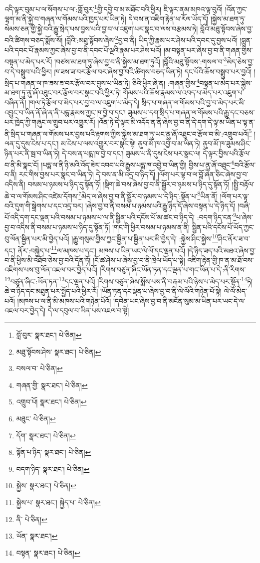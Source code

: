 འདི་ལྟར་བུམ་པ་ལ་སོགས་པ་ལ་:གློ་བུར་\footnote{བློ་བུར་  སྣར་ཐང་།  པེ་ཅིན། }གྱི་དབྱེ་བ་མ་མཐོང་བའི་ཕྱིར། ཇི་ལྟར་ནམ་མཁའ་ལྟ་བུའོ། །འོན་ཀྱང་ལྷག་མ་ནི་སྐྱེ་བ་གཞན་ལ་གོམས་པའི་ཁྱད་པར་ཡིན་ཏེ། དེ་བས་ན་འཇིག་རྟེན་ཕ་རོལ་ཡོད་དོ། །སྐྱེས་མ་ཐག་ཏུ་སེམས་ཅན་གྱི་སྐྱེ་བའི་རྒྱུ་སྲེད་པས་བྱས་པའི་བྱ་བ་ལ་འཇུག་པར་སྣང་བ་ལས་བརྩམས་ཏེ། བློའི་མཐུ་སྟོབས་ཞེས་བྱ་བའི་ཚིགས་བཅད་སྨོས་སོ། །བློའི་:མཐུ་སྟོབས་ཞེས་\footnote{མཐུ་སྟོབས་ཤེས་  སྣར་ཐང་།  པེ་ཅིན། }བྱ་བ་ནི། ཡིད་ཀྱི་རྣམ་པར་ཤེས་པའི་དབང་དུ་བྱས་པའོ། །བླུན་པའི་དབང་པོ་རྣམས་ཀྱང་ཞེས་བྱ་བ་ནི་དབང་པོ་ལྔའི་རྣམ་པར་ཤེས་པའོ། །མ་བསྟན་པར་ཞེས་བྱ་བ་ནི་གཞན་གྱིས་བསྟན་པ་མེད་པར་རོ། །བཙས་མ་ཐག་ཏུ་ཞེས་བྱ་བ་ནི་སྐྱེས་མ་ཐག་ཏུའོ། །བློའི་མཐུ་སྟོབས་:གསལ་བ་\footnote{བསལ་བ་  པེ་ཅིན། }མེད་ཅེས་བྱ་བ་དེ་བསྒྲུབ་པའི་ཕྱིར། ཁ་ཟས་ཟ་བར་རྩོལ་བར་ཞེས་བྱ་བའི་ཚིགས་བཅད་ཡིན་ཏེ། དང་པོའི་ཆོས་བསྒྲུབ་པར་བྱའོ། །སྲིད་པ་གཞན་ལ་ཁ་ཟས་ཟ་བར་རྩོལ་བར་བྱས་པ་ཡིན་ཏེ། ཅིའི་ཕྱིར་ཞེ་ན། :གཞན་གྱིས་\footnote{གཞན་གྱི་  སྣར་ཐང་།  པེ་ཅིན། }བསྟན་པ་མེད་པར་སྐྱེས་མ་ཐག་ཏུ་ནུ་ཞོ་འཐུང་བར་རྩོལ་བར་སྣང་བའི་ཕྱིར་ཏེ། གོམས་པའི་ཆོས་རྣམས་ལ་འབད་པ་མེད་པར་འཇུག་པ་བཞིན་ནོ། །གལ་ཏེ་རྩོལ་བ་མེད་པར་བྱ་བ་ལ་འཇུག་པ་མེད་དེ། སྲིད་པ་གཞན་ལ་གོམས་པའི་བྱ་བ་མེད་པར་མི་འབྱུང་བ་ཡིན་ནོ་ཞེ་ན་ནི་པདྨ་རྣམས་ཀྱང་ཁ་བྱེ་བ་དང་། ཟུམས་པ་དག་སྲིད་པ་གཞན་ལ་གོམས་པའི་རྒྱུ་དང་བཅས་པར་ཁྱེད་ཀྱི་གཞུང་ལ་གྲུབ་པར་འགྱུར་རོ། །འོན་ཏེ་དེ་ལྟར་མི་འདོད་ན་ནི་ཞེས་བྱ་བ་ནི་དེ་དག་དེ་ལྟ་མ་ཡིན་པ་ལྟ་ན་ནི་སྲིད་པ་གཞན་ལ་གོམས་པར་བྱས་པའི་རྟགས་ཀྱིས་སྐྱེས་མ་ཐག་ཏུ་ཡང་ནུ་ཞོ་འཐུང་བ་རྩོལ་བ་མི་:འགྲུབ་པའོ།\footnote{འགྲུབ་པོ།  སྣར་ཐང་།  པེ་ཅིན། } །ལན་དུ་དུས་ངེས་པ་དང་། མ་ངེས་པ་ལས་འགྱུར་བར་སྣང་སྟེ། ནུབ་མོ་ཁ་འབྱེ་བ་མ་ཡིན་ཏེ། ནུབ་མོ་ཁ་ཟུམས་ཤིང་ཉིན་པར་ནི་སྦ་བ་ཡིན་ཏེ། དེ་བས་ན་པདྨ་ཁ་བྱེ་བ་དང་། ཟུམས་པ་ནི་དུས་ངེས་པར་སྣང་ལ། དེ་ལྟར་བྱིས་པའི་རྩོལ་བ་ནི་མི་སྣང་ངོ། །པདྨ་ལ་ནི་ཉི་མའི་འོད་ཟེར་འབབ་པའི་རྒྱུས་པདྨ་ཁ་འབྱེ་བ་ཡིན་གྱི། བྱིས་པ་ནུ་ཞོ་འཐུང་\footnote{མཐུང་  པེ་ཅིན། }བའི་རྩོལ་བ་ནི། རང་གིས་བྱས་པར་སྣང་བ་ཡིན་ཏེ། དེ་བས་ན་མི་འདྲ་བ་ཉིད་དོ། །ལོག་པར་ལྟ་བ་ལ་བློ་ཞེན་ཅིང་ཞེས་བྱ་བ་འདིས་ནི། བསམ་པ་ཉམས་པ་ཉིད་དུ་སྟོན་ཏོ། །སྡིག་ཆེ་བས་ཞེས་བྱ་བ་ནི་སྦྱོར་བ་ཉམས་པ་ཉིད་དུ་སྟོན་ཏོ། །སྤྱི་བརྟོལ་ཆེ་བ་ལ་གོམས་ཤིང་འཛེམ་དོགས་\footnote{དོག་  སྣར་ཐང་།  པེ་ཅིན། }མེད་ལ་ཞེས་བྱ་བ་ནི་སྦྱོར་བ་ཉམས་པ་དེ་ཉིད་:སྟོན་པ་\footnote{སྟོན་པ་ཉིད་  སྣར་ཐང་།  པེ་ཅིན། }ཡིན་ནོ། །ལོག་པར་ལྟ་བའི་དུག་གི་སྒྲེགས་པ་དང་འདྲ་བར། །ཞེས་བྱ་བ་ནི་བསམ་པ་ཉམས་པའི་རྒྱུ་ཉིད་དོ་ཞེས་བསྟན་པ་དེ་ཉིད་དོ། །བཞི་པོ་འདི་དག་དང་ལྡན་པའི་བསམ་པ་ཉམས་པ་ལ་ནི་སྦྱིན་པའི་དངོས་པོ་མ་ཚང་བ་ཉིད་དེ། :བདག་ཉིད་ངན་\footnote{བདག་ཉིད་  སྣར་ཐང་།  པེ་ཅིན། }པ་ཞེས་བྱ་བ་འདིས་ནི་བསམ་པ་ཉམས་པ་ཉིད་དུ་སྟོན་ཏོ། །གང་གི་ཕྱིར་བསམ་པ་ཉམས་ན་ནི། སྦྱིན་པའི་དངོས་པོ་ཡོད་ཀྱང་བུ་ལོན་སྦྱིན་པར་མི་བྱེད་པའོ། །རྒྱུ་གསུམ་གྱིས་ཀྱང་སྦྱིན་པ་སྦྱིན་པར་མི་བྱེད་དེ། :སྐྱེས་ཤིང་སྐྱེས་\footnote{སྐྱེས་  སྣར་ཐང་།  པེ་ཅིན། }ཤིང་ནོར་ཟ་བ་དང་། ནོར་:བསྐྱེད་པ་\footnote{སྐྱེས་པ་  སྣར་ཐང་། སྐྱེད་པ་  པེ་ཅིན། }ལ་མཁས་པ་དང་། མཁས་པ་ཡིན་ཡང་ལེ་ལོ་དང་ལྡན་པའོ། །དེ་ཉིད་ཟད་པའི་མཐའ་ཞེས་བྱ་བ་ནི་ཕྱིས་མི་འཐོབ་ཅེས་བྱ་བའི་དོན་ཏོ། །ངོ་ཚ་ཤེས་པ་ཞེས་བྱ་བ་ནི་ཁྲེལ་ཡོད་པ་སྟེ། འཇིག་རྟེན་གྱི་ཁ་ན་མ་ཐོ་བས་འཇིགས་པས་བུ་ལོན་འཇལ་བར་བྱེད་པའོ། །རིགས་བཙུན་ཞིང་ཡོན་ཏན་དང་ལྡན་པ་གང་ཡིན་པ་དེ་:ནི་རིགས་\footnote{ནི་  པེ་ཅིན། }བཙུན་ཞིང་:ཡོན་ཏན་\footnote{ཡོན་  སྣར་ཐང་། }དང་ལྡན་པའོ། །རིགས་བཙུན་ཞེས་སྨོས་པས་ནི་བརྐམ་པའི་ཉེས་པ་མེད་པར་སྟོན་\footnote{བསྟན་  སྣར་ཐང་།  པེ་ཅིན། }ཏེ། ཆེ་བ་ཉིད་དང་མཐུན་པར་སྤྱོད་པའི་ཕྱིར་རོ། །ཡོན་ཏན་དང་ལྡན་པ་ཞེས་བྱ་བ་ནི་ལེ་ལོའི་གཉེན་པོ་སྟེ། ལེ་ལོ་མེད་པའོ། །མཁས་པ་ལ་ནི་མི་མཁས་པའི་གཉེན་པོའོ། །དབེན་ཡང་ཞེས་བྱ་བ་ནི་མངོན་སུམ་མ་ཡིན་པར་ཡང་དེ་ལ་འཇལ་བར་བྱེད་དེ། དེ་ལ་དབུལ་བ་ཡིན་པས་འཇལ་བ་སྟེ། 